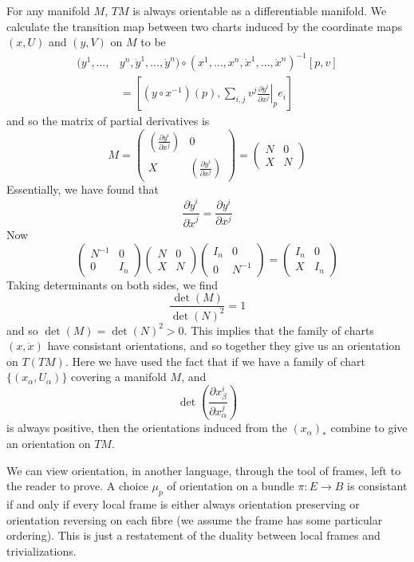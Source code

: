 \begin{example}
For any manifold $M$, $TM$ is always orientable as a differentiable manifold. We calculate the transition map between two charts induced by the coordinate maps $(x,U)$ and $(y,V)$ on $M$ to be
%
\begin{align*}
    (y^1, \dots, &y^n, \dot{y}^1, \dots, \dot{y}^n) \circ (x^1, \dots, x^n, \dot{x}^1, \dots, \dot{x}^n)^{-1}[p, v]\\
    &= \left[ (y \circ x^{-1})(p), \sum_{i,j} v^j \left. \frac{\partial y^i}{\partial x^j} \right|_p e_i \right]
\end{align*}
%
and so the matrix of partial derivatives is
%
\[ M = \begin{pmatrix} \left( \frac{\partial y^i}{\partial x^j} \right) & 0 \\ X & \left( \frac{\partial y^i}{\partial x^j} \right) \end{pmatrix} = \begin{pmatrix} N & 0 \\ X & N \end{pmatrix} \]
%
Essentially, we have found that
%
\[ \frac{\partial \dot{y}^i}{\partial \dot{x}^j} = \frac{\partial y^i}{\partial x^j} \]
%
Now
%
\[ \begin{pmatrix} N^{-1} & 0 \\ 0 & I_n \end{pmatrix} \begin{pmatrix} N & 0 \\ X & N \end{pmatrix} \begin{pmatrix} I_n & 0 \\ 0 & N^{-1} \end{pmatrix} = \begin{pmatrix} I_n & 0 \\ X & I_n \end{pmatrix} \]
%
Taking determinants on both sides, we find
%
\[ \frac{\det(M)}{\det(N)^2} = 1 \]
%
and so $\det(M) = \det(N)^2 > 0$. This implies that the family of charts $(x,\dot{x})$ have consistant orientations, and so together they give us an orientation on $T(TM)$. Here we have used the fact that if we have a family of chart $\{ (x_\alpha, U_\alpha) \}$ covering a manifold $M$, and
%
\[ \det \left(\frac{\partial x^i_\beta}{\partial x^j_\alpha}\right) \]
%
is always positive, then the orientations induced from the $(x_\alpha)_*$ combine to give an orientation on $TM$.
\end{example}

We can view orientation, in another language, through the tool of frames, left to the reader to prove. A choice $\mu_p$ of orientation on a bundle $\pi: E \to B$ is consistant if and only if every local frame is either always orientation preserving or orientation reversing on each fibre (we assume the frame has some particular ordering). This is just a restatement of the duality between local frames and trivializations.

